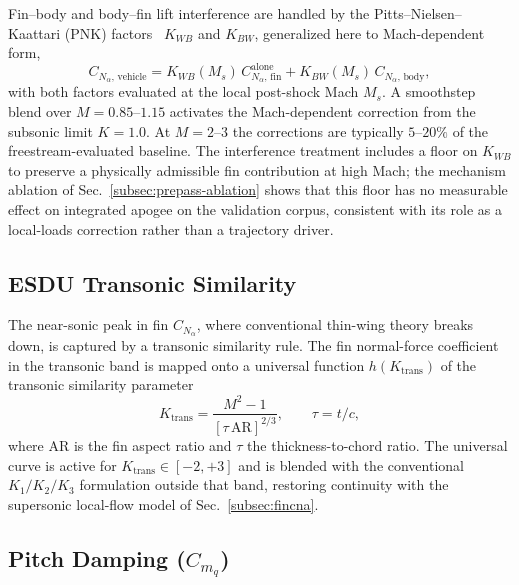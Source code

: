 Fin--body and body--fin lift interference are handled by the
Pitts--Nielsen--Kaattari (PNK) factors~\cite{pitts1957} $K_{WB}$ and
$K_{BW}$, generalized here to Mach-dependent form,
%
\begin{equation}
C_{N_\alpha,\,\mathrm{vehicle}} =
  K_{WB}(M_s)\,C_{N_\alpha,\,\mathrm{fin}}^{\mathrm{alone}}
  + K_{BW}(M_s)\,C_{N_\alpha,\,\mathrm{body}},
\label{eq:pnk}
\end{equation}
%
with both factors evaluated at the local post-shock Mach $M_s$. A
smoothstep blend over $M = 0.85$--$1.15$ activates the Mach-dependent
correction from the subsonic limit $K = 1.0$. At $M = 2$--$3$ the
corrections are typically $5$--$20\%$ of the freestream-evaluated
baseline. The interference treatment includes a floor on $K_{WB}$ to
preserve a physically admissible fin contribution at high Mach; the
mechanism ablation of Sec.~\ref{subsec:prepass-ablation} shows that this
floor has no measurable effect on integrated apogee on the validation corpus,
consistent with its role as a local-loads correction rather than a
trajectory driver.

\subsection{ESDU Transonic Similarity}
\label{subsec:esdu}

The near-sonic peak in fin $C_{N_\alpha}$, where conventional thin-wing
theory breaks down, is captured by a transonic similarity rule. The fin
normal-force coefficient in the transonic band is mapped onto a universal
function $h(K_{\mathrm{trans}})$ of the transonic similarity parameter
%
\begin{equation}
K_{\mathrm{trans}} = \frac{M^2 - 1}{[\tau\,\mathrm{AR}]^{2/3}},
  \qquad \tau = t/c,
\label{eq:ktrans}
\end{equation}
%
where $\mathrm{AR}$ is the fin aspect ratio and $\tau$ the
thickness-to-chord ratio. The universal curve is active for
$K_{\mathrm{trans}} \in [-2,+3]$ and is blended with the conventional
$K_1/K_2/K_3$ formulation outside that band, restoring continuity with
the supersonic local-flow model of Sec.~\ref{subsec:fincna}.

\subsection{Pitch Damping ($C_{m_q}$)}
\label{subsec:cmq}

